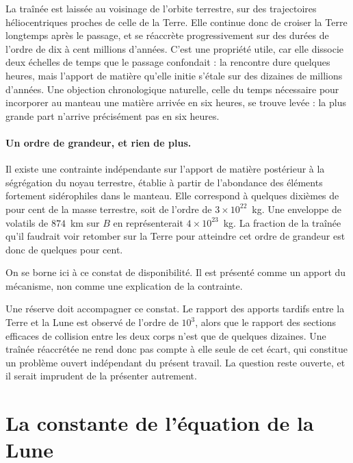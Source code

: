 \documentclass[11pt,a4paper,openany]{report}
\begin{document}
\begin{ideephys}
La traînée est laissée au voisinage de l'orbite terrestre, sur des trajectoires héliocentriques
proches de celle de la Terre. Elle continue donc de croiser la Terre longtemps après le passage, et
se réaccrète progressivement sur des durées de l'ordre de dix à cent millions d'années. C'est une
propriété utile, car elle dissocie deux échelles de temps que le passage confondait : la rencontre
dure quelques heures, mais l'apport de matière qu'elle initie s'étale sur des dizaines de millions
d'années. Une objection chronologique naturelle, celle du temps nécessaire pour incorporer au
manteau une matière arrivée en six heures, se trouve levée : la plus grande part n'arrive
précisément pas en six heures.
\end{ideephys}

\paragraph{Un ordre de grandeur, et rien de plus.} Il existe une contrainte indépendante sur
l'apport de matière postérieur à la ségrégation du noyau terrestre, établie à partir de l'abondance
des éléments fortement sidérophiles dans le manteau. Elle correspond à quelques dixièmes de pour
cent de la masse terrestre, soit de l'ordre de $3\times10^{22}$~kg. Une enveloppe de volatils de
$874$~km sur $B$ en représenterait $4\times10^{23}$~kg. La fraction de la traînée qu'il faudrait
voir retomber sur la Terre pour atteindre cet ordre de grandeur est donc de quelques pour cent.

On se borne ici à ce constat de disponibilité. Il est présenté comme un apport du mécanisme, non
comme une explication de la contrainte.

\begin{controle}
Une réserve doit accompagner ce constat. Le rapport des apports tardifs entre la Terre et la Lune
est observé de l'ordre de $10^{3}$, alors que le rapport des sections efficaces de collision entre
les deux corps n'est que de quelques dizaines. Une traînée réaccrétée ne rend donc pas compte à
elle seule de cet écart, qui constitue un problème ouvert indépendant du présent travail. La
question reste ouverte, et il serait imprudent de la présenter autrement.
\end{controle}

\section{La constante de l'équation de la Lune}
\label{sec:constante-lune}
\end{document}
